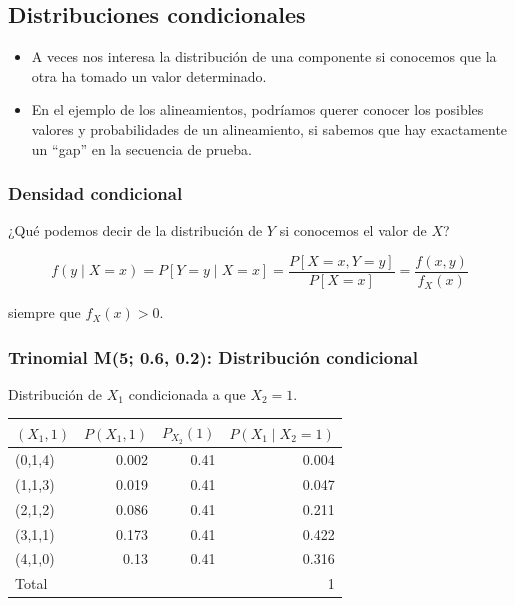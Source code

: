 \documentclass[
]{article}
\begin{document}
\subsection{Distribuciones condicionales}\label{distribuciones-condicionales}

\begin{itemize}
\item
  A veces nos interesa la distribución de una componente si conocemos que la otra ha tomado un valor determinado.
\item
  En el ejemplo de los alineamientos, podríamos querer conocer los posibles valores y probabilidades de un alineamiento, si sabemos que hay exactamente un ``gap'' en la secuencia de prueba.
\end{itemize}

\subsubsection{Densidad condicional}\label{densidad-condicional}

¿Qué podemos decir de la distribución de \(Y\) si conocemos el valor de \(X\)?

\[
f(y \mid X = x) = P[Y = y \mid X = x] = \frac{P[X = x, Y = y]}{P[X = x]} = \frac{f(x, y)}{f_X(x)}
\]

siempre que \(f_X(x) > 0\).

\subsubsection{Trinomial M(5; 0.6, 0.2): Distribución condicional}\label{trinomial-m5-0.6-0.2-distribuciuxf3n-condicional}

Distribución de \(X_1\) condicionada a que \(X_2 = 1\).

\begin{longtable}[]{@{}lrrr@{}}
\toprule\noalign{}
\((X_1, 1)\) & \(P(X_1, 1)\) & \(P_{X_2}(1)\) & \(P(X_1 \mid X_2 = 1)\) \\
\midrule\noalign{}
\endhead
\bottomrule\noalign{}
\endlastfoot
(0,1,4) & 0.002 & 0.41 & 0.004 \\
(1,1,3) & 0.019 & 0.41 & 0.047 \\
(2,1,2) & 0.086 & 0.41 & 0.211 \\
(3,1,1) & 0.173 & 0.41 & 0.422 \\
(4,1,0) & 0.13 & 0.41 & 0.316 \\
Total & & & 1 \\
\end{longtable}
\end{document}
